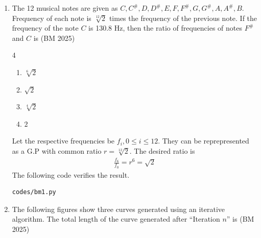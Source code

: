 
\begin{enumerate}[label=\thesubsection.\arabic*, ref=\thesubsection.\theenumi]
\item The 12 musical notes are given as
$C,C^\#,D,D^\#,E,F,F^\#,G,G^\#,A,A^\#,B$.
Frequency of each note is $\sqrt[12]{2}$ times the frequency of the previous note.
If the frequency of the note $C$ is 130.8 Hz, then the ratio of frequencies of notes
$F^\#$ and $C$ is \hfill (BM 2025)
%
\begin{multicols}{4}
\begin{enumerate}
    \setlength{\itemsep}{0pt}
    \item $\sqrt[6]{2}$
    \item $\sqrt{2}$
    \item $\sqrt[4]{2}$
    \item $2$
\end{enumerate}
\end{multicols}
\solution
Let the respective frequencies be $f_i, 0 \le i \le 12$. They can be reprepresented as a G.P with common ratio $r = \sqrt[12]{2}$.  The desired ratio is
%
\begin{align}
\frac{f_{6}}{f_0}
= r^6
=\sqrt{2}
\end{align}
The following code verifies the result.
\begin{lstlisting}
codes/bm1.py
\end{lstlisting}
\item The following figures show three curves generated using an
iterative algorithm. The total length of the curve generated after
``Iteration $n$'' is
\hfill (BM 2025)

\vspace{1.2cm}
\begin{tikzpicture}[scale=1.4]


\end{tikzpicture}
\end{enumerate}
